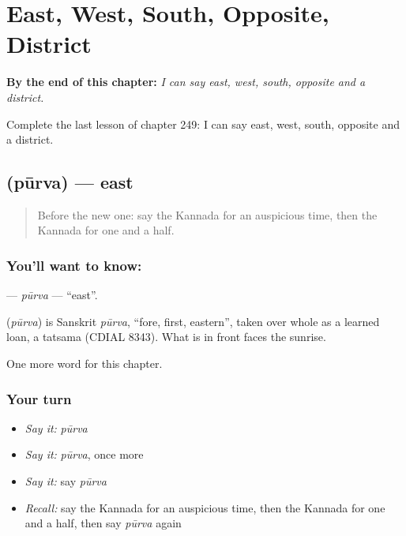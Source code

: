 
\chapter{East, West, South, Opposite, District}
\label{ch:ka-east-west-south-opposite-district}

\begin{chapteropening}
\textbf{By the end of this chapter:} \emph{I can say east, west, south, opposite and a district.}

Complete the last lesson of chapter 249: I can say east, west, south, opposite and a district.
\end{chapteropening}

\section[\texorpdfstring{\kn{ಪೂರ್ವ} (pūrva)}{ಪೂರ್ವ (pūrva)}]{ (pūrva) — east}

\label{lesson:KA-C249-purva}



\begin{quote}
Before the new one: say the Kannada for an auspicious time, then the Kannada for one and a half.
\end{quote}

\subsection*{You'll want to know: }
\textbf{} — \emph{pūrva} — \textquotedblleft{}east\textquotedblright{}.

\begin{cousinweb}
\textbf{} (\emph{pūrva}) is Sanskrit \emph{pūrva}, \textquotedblleft{}fore, first, eastern\textquotedblright{}, taken over whole as a learned loan, a tatsama (CDIAL 8343). What is in front faces the sunrise.
\end{cousinweb}

\begin{grammarlens}[title={What you've built}]
One more word for this chapter.
\end{grammarlens}

\subsection*{Your turn}
\begin{itemize}
\raggedright
  \item \emph{Say it:} \emph{pūrva}
  \item \emph{Say it:} \emph{pūrva}, once more
  \item \emph{Say it:} say \emph{pūrva}
  \item \emph{Recall:} say the Kannada for an auspicious time, then the Kannada for one and a half, then say \emph{pūrva} again
\end{itemize}

